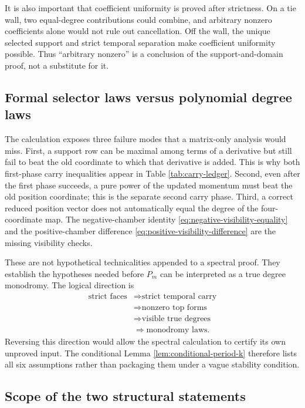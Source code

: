 \documentclass[11pt]{article}
\theoremstyle{definition}
\theoremstyle{remark}
\begin{document}
It is also important that coefficient uniformity is proved after strictness.
On a tie wall, two equal-degree contributions could combine, and arbitrary
nonzero coefficients alone would not rule out cancellation.  Off the wall,
the unique selected support and strict temporal separation make coefficient
uniformity possible.  Thus ``arbitrary nonzero'' is a conclusion of the
support-and-domain proof, not a substitute for it.

\subsection{Formal selector laws versus polynomial degree laws}

The calculation exposes three failure modes that a matrix-only analysis
would miss.  First, a support row can be maximal among terms of a derivative
but still fail to beat the old coordinate to which that derivative is added.
This is why both first-phase carry inequalities appear in Table
\ref{tab:carry-ledger}.  Second, even after the first phase succeeds, a pure
power of the updated momentum must beat the old position coordinate; this is
the separate second carry phase.  Third, a correct reduced position vector
does not automatically equal the degree of the four-coordinate map.  The
negative-chamber identity \eqref{eq:negative-visibility-equality} and the
positive-chamber difference \eqref{eq:positive-visibility-difference} are
the missing visibility checks.

These are not hypothetical technicalities appended to a spectral proof.
They establish the hypotheses needed before \(P_m\) can be interpreted as a
true degree monodromy.  The logical direction is
\[
\begin{aligned}
\text{strict faces}
&\Longrightarrow \text{strict temporal carry}\\
&\Longrightarrow \text{nonzero top forms}\\
&\Longrightarrow \text{visible true degrees}\\
&\Longrightarrow \text{monodromy laws}.
\end{aligned}
\]
Reversing this direction would allow the spectral calculation to certify its
own unproved input.  The conditional Lemma \ref{lem:conditional-period-k}
therefore lists all six assumptions rather than packaging them under a vague
stability condition.

\subsection{Scope of the two structural statements}
\end{document}
